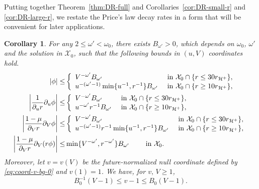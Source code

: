 \documentclass[10pt, reqno]{amsart}
\newtheorem{corollary}[theorem]{Corollary}
\theoremstyle{definition}
\theoremstyle{remark}
\theoremstyle{conjecture}
\numberwithin{equation}{section}
\newcommand{\set}[1]{\{#1\}}
\newcommand{\rd}{\partial}
\newcommand{\0}{\emptyset}
\newcommand{\omg}{\omega}
\newcommand{\calH}{\mathcal H}
\newcommand{\calX}{\mathcal X}
\newcommand{\EH}{\calH^{+}}
\newcommand{\Abs}[1]{\left\vert #1 \right\vert}
\begin{document}
Putting together Theorem~\ref{thm:DR-full} and Corollaries~\ref{cor:DR-small-r} and \ref{cor:DR-large-r}, we restate the Price's law decay rates in a form that will be convenient for later applications.
\begin{corollary} \label{cor:DR-final}
For any $2 \leq \omg' < \omg_{0}$, there exists $B_{\omg'} > 0$, which depends on $\omg_{0}$, $\omg'$ and the solution in $\calX_{0}$, such that the following bounds in $(u,V)$ coordinates hold.
\begin{align}
	\Abs{\phi} \leq & \left\{
\begin{array}{ll}
 V^{-\omg'} B_{\omg'} & \hbox{ in } \calX_{0} \cap \set{r \leq 30 r_{\EH}} , \\
 u^{-(\omg'-1)} \min \set{ u^{-1}, r^{-1}} B_{\omg'}  & \hbox{ in } \calX_{0} \cap \set{r \geq 10 r_{\EH}} ,
\end{array}\right.  		\label{eq:DR-final:phi} \\
%
	\Abs{\frac{1}{\rd_{u} r}\rd_{u} \phi} \leq & \left\{
\begin{array}{ll}
V^{-\omg'} B_{\omg'}  & \hbox{ in } \calX_{0} \cap \set{r \leq 30 r_{\EH}} , \\
u^{-\omg'} r^{-1} B_{\omg'}   & \hbox{ in } \calX_{0} \cap \set{r \geq 10 r_{\EH}} ,
\end{array}\right. 	\label{eq:DR-final:duphi} \\
%
	\Abs{\frac{1-\mu}{\rd_{V} r}\rd_{V} \phi} \leq & \left\{
\begin{array}{ll}
V^{-\omg'}  B_{\omg'} & \hbox{ in } \calX_{0} \cap \set{r \leq 30 r_{\EH}} , \\
u^{-(\omg'-1)} r^{-1}  \min \set{ u^{-1}, r^{-1}} B_{\omg'}  & \hbox{ in } \calX_{0} \cap \set{r \geq 10 r_{\EH}} ,
\end{array}\right. 	\label{eq:DR-final:dvphi} \\
%
	\Abs{\frac{1-\mu}{\rd_{V} r}\rd_{V} (r \phi)} \leq & 
\min \set{V^{-\omg'}, r^{-\omg'}} B_{\omg'}	 \qquad \hbox{ in } \calX_{0}	. \label{eq:DR-final:dvrphi}
\end{align}
Moreover, let $v = v(V)$ be the future-normalized null coordinate defined by \eqref{eq:coord-v-bg-0} and $v(1) = 1$. We have, for $v,\, V\geq 1$,
\begin{equation} \label{eq:DR-final:vV}
	B_{0}^{-1} (V-1) \leq v-1 \leq B_{0} (V -1).
\end{equation}
\end{corollary}
\end{document}
